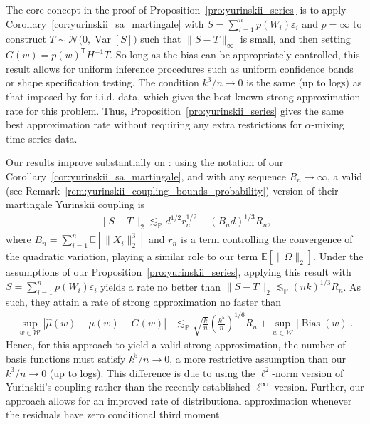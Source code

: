 \documentclass[11pt,lof]{puthesis}
\renewcommand{\P}{\ensuremath{\mathbb{P}}}
\newcommand{\E}{\ensuremath{\mathbb{E}}}
\newcommand{\cN}{\ensuremath{\mathcal{N}}}
\newcommand{\cW}{\ensuremath{\mathcal{W}}}
\newcommand{\T}{\ensuremath{\mathsf{T}}}
\DeclareMathOperator{\Var}{Var}
\DeclareMathOperator{\Bias}{Bias}
\theoremstyle{break}
\theoremstyle{proof}
\begin{document}
The core concept in the proof of Proposition~\ref{pro:yurinskii_series} is to
apply
Corollary~\ref{cor:yurinskii_sa_martingale} with
$S = \sum_{i=1}^n p(W_i) \varepsilon_i$
and $p=\infty$ to construct $T \sim \cN\big(0, \Var[S]\big)$ such that
$\|S - T \|_\infty$ is small, and then setting $G(w) = p(w)^\T H^{-1} T$. So
long as the bias can be appropriately controlled, this result allows for
uniform inference procedures such as uniform confidence bands or shape
specification testing. The condition $k^3 / n \to 0$ is the same (up to logs)
as that imposed by \citet{cattaneo2020large} for i.i.d. data, which gives the
best known strong approximation rate for this problem. Thus,
Proposition~\ref{pro:yurinskii_series} gives the same best approximation rate
without
requiring any extra restrictions for $\alpha$-mixing time series data.

Our results improve substantially on \citet[Theorem~1]{li2020uniform}: using
the notation of our Corollary~\ref{cor:yurinskii_sa_martingale}, and with any
sequence
$R_n \to \infty$, a valid (see
Remark~\ref{rem:yurinskii_coupling_bounds_probability})
version of their martingale Yurinskii coupling is
%
\begin{align*}
  \|S-T\|_2
  \lesssim_\P
  d^{1/2} r^{1/2}_n
  + (B_n d)^{1/3} R_n,
\end{align*}
%
where $B_n = \sum_{i=1}^n \E[\|X_i\|_2^3]$ and $r_n$ is a term controlling the
convergence of the quadratic variation, playing a similar role to our
term $\E[\|\Omega\|_2]$. Under the assumptions of our
Proposition~\ref{pro:yurinskii_series}, applying this
result with $S = \sum_{i=1}^n p(W_i) \varepsilon_i$ yields a rate no better
than $\|S-T\|_2 \lesssim_\P (n k)^{1/3} R_n$. As such, they attain a rate of
strong approximation no faster than
%
\begin{align*}
  \sup_{w \in \cW}
  \left| \hat\mu(w) - \mu(w) - G(w) \right|
  &\lesssim_\P
  \sqrt{\frac{k}{n}}
  \left( \frac{k^5}{n} \right)^{1/6} R_n
  + \sup_{w \in \cW} |\Bias(w)|.
\end{align*}
%
Hence, for this approach to yield a valid strong approximation, the number of
basis functions must satisfy $k^5/n \to 0$, a more restrictive assumption than
our $k^3 / n \to 0$ (up to logs). This difference is due to
\citet{li2020uniform} using the $\ell^2$-norm version of Yurinskii's coupling
rather than the recently established $\ell^\infty$ version. Further,
our approach allows for an improved rate of distributional approximation
whenever the residuals have zero conditional third moment.
\end{document}
